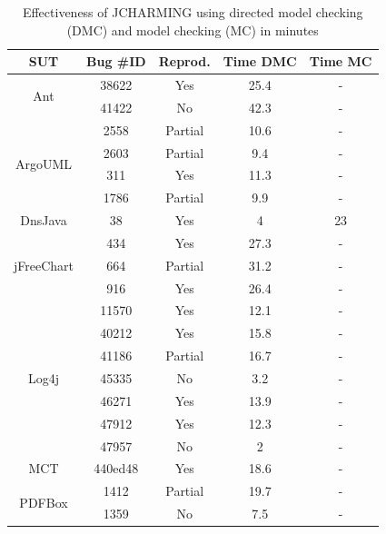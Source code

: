 \documentclass[times, doublespace]{smrauth}
\begin{document}
{\begin{table}
\centering
\caption{Effectiveness of JCHARMING using directed model checking (DMC) and model checking (MC) in minutes}
\begin{tabular}{c|c|c|c|c}
SUT                         & Bug \#ID & Reprod. & Time DMC & Time MC \\ \hline \hline
\multirow{2}{*}{Ant}        & 38622    & Yes     & 25.4     & -       \\
                            & 41422    & No      & 42.3     & -       \\ \hline
\multirow{4}{*}{ArgoUML}    & 2558     & Partial & 10.6     & -       \\
                            & 2603     & Partial & 9.4      & -       \\
                            & 311      & Yes     & 11.3     & -       \\
                            & 1786     & Partial & 9.9      & -       \\  \hline
DnsJava                     & 38       & Yes     & 4        & 23      \\ \hline
\multirow{3}{*}{jFreeChart} & 434      & Yes     & 27.3     & -       \\
                            & 664      & Partial & 31.2     & -       \\
                            & 916      & Yes     & 26.4     & -       \\ \hline
\multirow{7}{*}{Log4j}      & 11570    & Yes     & 12.1     & -       \\
                            & 40212    & Yes     & 15.8     & -       \\
                            & 41186    & Partial & 16.7     & -       \\
                            & 45335    & No      & 3.2      & -       \\
                            & 46271    & Yes     & 13.9     & -       \\
                            & 47912    & Yes     & 12.3     & -       \\
                            & 47957    & No      & 2        & -       \\ \hline
MCT                         & 440ed48  & Yes     & 18.6     & -       \\ \hline
\multirow{2}{*}{PDFBox}     & 1412     & Partial & 19.7     & -       \\
                            & 1359     & No      & 7.5        & - \\ \hline

\end{tabular}
\end{table}}
\end{document}
